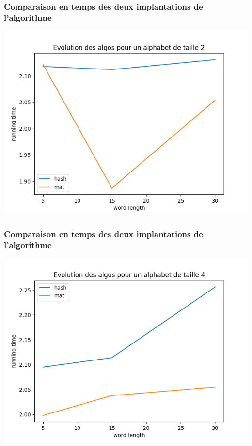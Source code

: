 \documentclass{beamer}
\begin{document}
  \begin{frame}
    \frametitle{Comparaison en temps des deux implantations de l'algorithme}
    \begin{center}
      \includegraphics[scale = 0.5]{../Courbes/alphabet_2.png}
    \end{center}
  \end{frame}
  
  \begin{frame}
    \frametitle{Comparaison en temps des deux implantations de l'algorithme}
    \begin{center}
      \includegraphics[scale = 0.5]{../Courbes/alphabet_4.png}
    \end{center}
  \end{frame}
\end{document}
